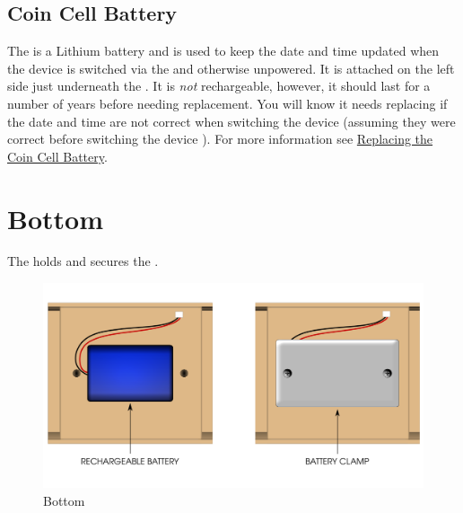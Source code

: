 \section{Coin Cell Battery} \label{Coin Cell Battery}

The  is a   Lithium battery and is used
to keep the date and time updated when the device is switched  via the
\hyperref[Power Switch]{} and otherwise unpowered.  It is attached on the
left side just underneath the .  It is \textit{not} rechargeable,
however, it should last for a number of years before needing replacement.  You
will know it needs replacing if the date and time are not correct when switching
the device  (assuming they were correct before switching the device
).  For more information see
\hyperref[Replacing Battery]{Replacing the Coin Cell Battery}.

\chapter{Bottom} \label{Bottom}

The  holds and secures the .

\begin{figure}[H]
\centering
  \includegraphics{images/bottom.png}
\caption{Bottom}
\end{figure}

